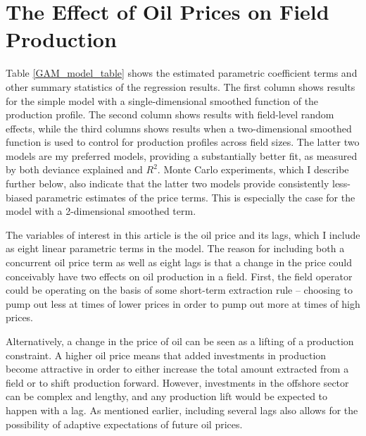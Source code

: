 \documentclass[12pt]{article}
\begin{document}
\section{The Effect of Oil Prices on Field Production}

Table \ref{GAM_model_table} shows the estimated parametric coefficient terms and other summary statistics of the regression results.  The first column shows results for the simple model with a single-dimensional smoothed function of the production profile.  The second column shows results with field-level random effects, while the third columns shows results when a two-dimensional smoothed function is used to control for production profiles across field sizes. The latter two models are my preferred models, providing a substantially better fit, as measured by both deviance explained and $R^2$. Monte Carlo experiments, which I describe further below, also indicate that the latter two models provide consistently less-biased parametric estimates of the price terms. This is especially the case for the model with a 2-dimensional smoothed term.

The variables of interest in this article is the oil price and its lags, which I include as eight linear parametric terms in the model.  The reason for including both a concurrent oil price term as well as eight lags is that a change in the price could conceivably have two effects on oil production in a field.  First, the field operator could be operating on the basis of some short-term extraction rule -- choosing to pump out less at times of lower prices in order to pump out more at times of high prices.

Alternatively, a change in the price of oil can be seen as a lifting of a production constraint.  A higher oil price means that added investments in production become attractive in order to either increase the total amount extracted from a field or to shift production forward.  However, investments in the offshore sector can be complex and lengthy, and any production lift would be expected to happen with a lag.  As mentioned earlier, including several lags also allows for the possibility of adaptive expectations of future oil prices.  
\end{document}
